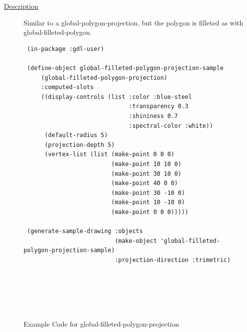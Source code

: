 \documentclass [11pt]{book}
\begin{document}
\begin{itemize}
\begin{description}

\item [
\underline{Description}]


Similar to a global-polygon-projection, but the polygon is filleted
as with global-filleted-polygon.



\end{description}




\begin{figure}
\begin{lrbox}{\boxedverb}
\begin{minipage}{\linewidth}
{\small

\begin{verbatim}
 (in-package :gdl-user)

 (define-object global-filleted-polygon-projection-sample 
     (global-filleted-polygon-projection)
     :computed-slots
     ((display-controls (list :color :blue-steel 
                              :transparency 0.3 
                              :shininess 0.7 
                              :spectral-color :white))
      (default-radius 5)
      (projection-depth 5)
      (vertex-list (list (make-point 0 0 0)
                         (make-point 10 10 0)
                         (make-point 30 10 0)
                         (make-point 40 0 0)
                         (make-point 30 -10 0)
                         (make-point 10 -10 0)
                         (make-point 0 0 0)))))

 (generate-sample-drawing :objects 
                          (make-object 'global-filleted-polygon-projection-sample)
                          :projection-direction :trimetric)






\end{verbatim}}
\end{minipage}
\end{lrbox}
\fbox{\usebox{\boxedverb}}

\caption{Example Code for global-filleted-polygon-projection}

\label{fig:example-code-global-filleted-polygon-projection}

\end{figure}


\end{itemize}
\end{document}
